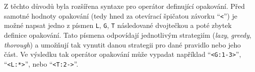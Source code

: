 Z těchto důvodů byla rozšířena syntaxe pro operátor definující opakování.
Před samotné hodnoty opakování (tedy hned za otevírací špičatou závorku \enquote{\texttt{<}}) je možné napsat
jedno z písmen \texttt{L}, \texttt{G}, \texttt{T} následované dvojtečkou a poté zbytek definice opakování.
Tato písmena odpovídají jednotlivým strategiím (\emph{lazy}, \emph{greedy}, \emph{thorough}) a umožňují tak vynutit danou strategii pro dané pravidlo nebo jeho část.
Ve výsledku tak operátor opakování může vypadat například \enquote{\texttt{<G:1-3>}}, \enquote{\texttt{<L:*>}}, nebo \enquote{\texttt{<T:2->}}.
